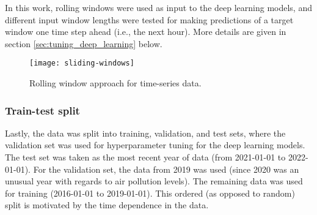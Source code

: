 In this work, rolling windows were used as input to the deep learning models, and different input window lengths were tested for making predictions of a target window one time step ahead (i.e., the next hour). More details are given in section \ref{sec:tuning_deep_learning} below.
 \begin{figure}[h]
\begin{center}
\texttt{[image: sliding-windows]}
\caption{Rolling window approach for time-series data.}
\label{fig:sliding-window}
\end{center}
\end{figure}
\subsubsection{Train-test split} 
Lastly, the data was split into training, validation, and test sets, where the validation set was used for hyperparameter tuning for the deep learning models. The test set was taken as the most recent year of data (from 2021-01-01 to 2022-01-01). For the validation set, the data from 2019 was used (since 2020 was an unusual year with regards to air pollution levels). The remaining data was used for training (2016-01-01 to 2019-01-01). This ordered (as opposed to random) split is motivated by the time dependence in the data.


